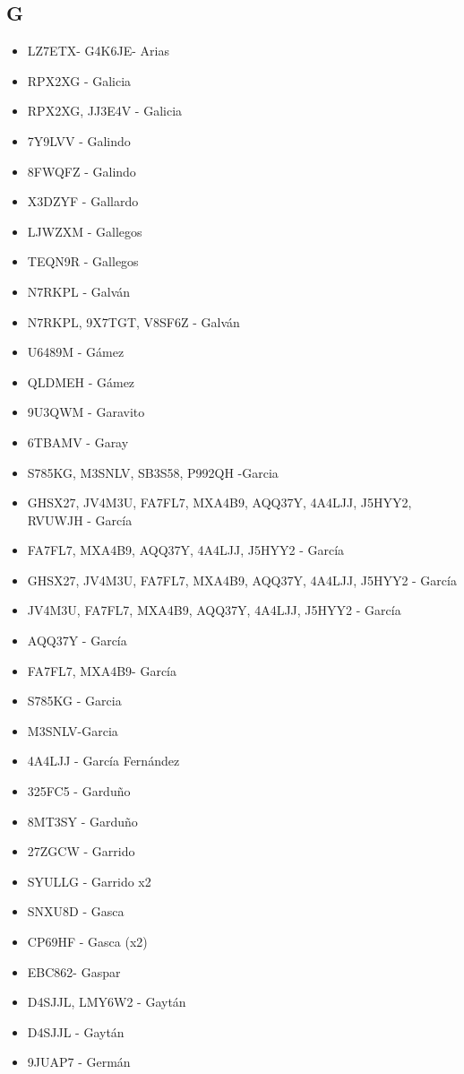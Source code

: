 \subsection*{G}
\begin{itemize}[leftmargin=*,nosep]
\item LZ7ETX- G4K6JE- Arias
\item RPX2XG - Galicia
\item RPX2XG, JJ3E4V - Galicia
\item 7Y9LVV - Galindo
\item 8FWQFZ - Galindo
\item X3DZYF  -  Gallardo
\item LJWZXM  -  Gallegos
\item TEQN9R  -  Gallegos
\item N7RKPL - Galván
\item N7RKPL, 9X7TGT, V8SF6Z - Galván
\item U6489M  -  Gámez
\item QLDMEH - Gámez
\item 9U3QWM - Garavito
\item 6TBAMV - Garay
\item S785KG, M3SNLV, SB3S58, P992QH -Garcia
\item GHSX27, JV4M3U, FA7FL7, MXA4B9, AQQ37Y, 4A4LJJ, J5HYY2, RVUWJH - García
\item FA7FL7, MXA4B9, AQQ37Y, 4A4LJJ, J5HYY2 - García
\item GHSX27, JV4M3U, FA7FL7, MXA4B9, AQQ37Y, 4A4LJJ, J5HYY2 - García
\item JV4M3U, FA7FL7, MXA4B9, AQQ37Y, 4A4LJJ, J5HYY2 - García
\item AQQ37Y  -  García
\item FA7FL7, MXA4B9-  García
\item S785KG  -  Garcia
\item M3SNLV-Garcia
\item 4A4LJJ  -  García Fernández
\item 325FC5 - Garduño
\item 8MT3SY  -  Garduño
\item 27ZGCW - Garrido
\item SYULLG - Garrido x2
\item SNXU8D - Gasca
\item CP69HF - Gasca (x2)
\item EBC862- Gaspar
\item D4SJJL, LMY6W2 - Gaytán
\item D4SJJL  -  Gaytán
\item 9JUAP7 - Germán

\end{itemize}

